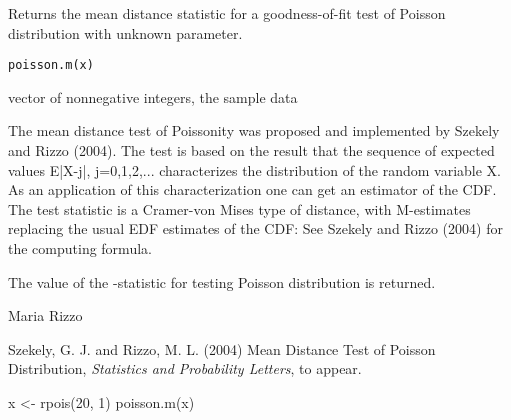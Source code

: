 \begin{Description}\relax
Returns the mean distance statistic for a goodness-of-fit test of Poisson distribution with unknown parameter.
\end{Description}
\begin{Usage}
\begin{verbatim}
poisson.m(x)
\end{verbatim}
\end{Usage}
\begin{Arguments}
\begin{ldescription}
\item[\code{x}] vector of nonnegative integers, the sample data 
\end{ldescription}
\end{Arguments}
\begin{Details}\relax
The mean distance test of Poissonity was proposed and implemented by Szekely and Rizzo (2004). The test is based on the result that the sequence of expected values E|X-j|, j=0,1,2,... characterizes the distribution of the random variable X. As an application of this characterization one can get an estimator  of the CDF. The test statistic is a Cramer-von Mises type of distance, with M-estimates replacing the usual EDF estimates of the CDF: 
 See Szekely and Rizzo (2004) for the computing formula.
\end{Details}
\begin{Value}
The value of the -statistic for testing Poisson distribution is returned.\end{Value}
\begin{Author}\relax
Maria Rizzo 
\end{Author}
\begin{References}\relax
Szekely, G. J. and Rizzo, M. L. (2004) Mean Distance Test
of Poisson Distribution, \emph{Statistics and Probability Letters}, to appear.
\end{References}
\begin{SeeAlso}\relax
{}
\end{SeeAlso}
\begin{Examples}
\begin{ExampleCode}
 x <- rpois(20, 1)
poisson.m(x)
 \end{ExampleCode}
\end{Examples}

